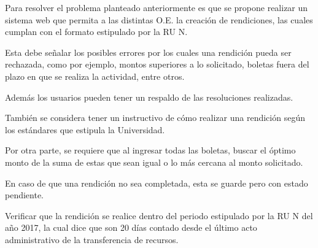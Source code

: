 Para resolver el problema planteado anteriormente es que se propone realizar un sistema web que permita a las distintas O.E. la creación de rendiciones, las cuales cumplan con el formato estipulado por la RU N.

Esta debe señalar los posibles errores por los cuales una rendición pueda ser rechazada, como por ejemplo, montos superiores a lo solicitado, boletas fuera del plazo en que se realiza la actividad, entre otros.

Además los usuarios pueden tener un respaldo de las resoluciones realizadas.

También se considera tener un instructivo de cómo realizar una rendición según los estándares que estipula la Universidad.   

Por otra parte, se requiere que al ingresar todas las boletas, buscar el óptimo monto de la suma de estas que sean igual o lo más cercana al monto solicitado.

En caso de que una rendición no sea completada, esta se guarde pero con estado pendiente.

Verificar que la rendición se realice dentro del periodo estipulado por la RU N del año 2017, la cual dice que son 20 días contado desde el último acto administrativo de la transferencia de recursos.